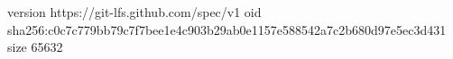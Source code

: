 version https://git-lfs.github.com/spec/v1
oid sha256:c0c7c779bb79c7f7bee1e4c903b29ab0e1157e588542a7c2b680d97e5ec3d431
size 65632
